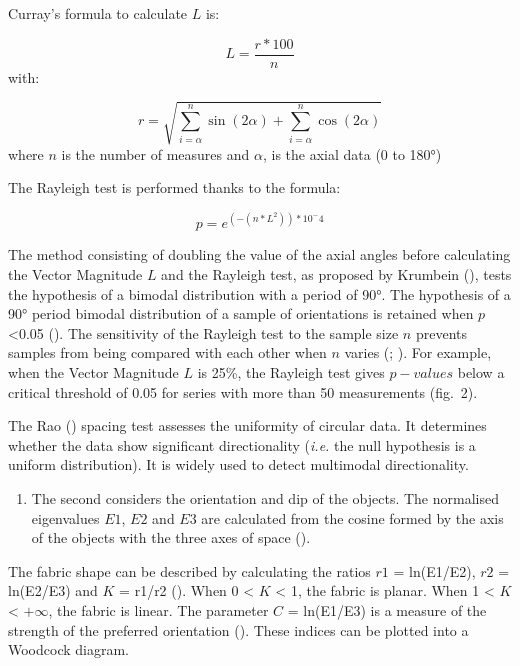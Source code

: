 \documentclass[
]{article}
\providecommand{\tightlist}{%
  \setlength{\itemsep}{0pt}\setlength{\parskip}{0pt}}
\begin{document}
Curray's formula to calculate \(L\) is:

\[L = \frac{r*100}{n}\] with:

\[r = \sqrt{\sum_{i=\alpha}^n \sin{(2\alpha)} + \sum_{i=\alpha}^n \cos{(2\alpha)}}\]
\smallbreak where \(n\) is the number of measures and \(\alpha\), is the
axial data (0 to 180°) \smallbreak

The Rayleigh test is performed thanks to the formula:

\[p = e^{(-(n*L^2))*10^-4}\]

The method consisting of doubling the value of the axial angles before
calculating the Vector Magnitude \(L\) and the Rayleigh test, as
proposed by Krumbein (), tests the
hypothesis of a bimodal distribution with a period of 90°. The
hypothesis of a 90° period bimodal distribution of a sample of
orientations is retained when \(p\) \textless0.05
(). The sensitivity of the
Rayleigh test to the sample size \(n\) prevents samples from being
compared with each other when \(n\) varies
(;
). For example, when
the Vector Magnitude \(L\) is 25\%, the Rayleigh test gives \(p-values\)
below a critical threshold of 0.05 for series with more than 50
measurements (fig.~2).

The Rao () spacing test assesses the
uniformity of circular data. It determines whether the data show
significant directionality (\emph{i.e.} the null hypothesis is a uniform
distribution). It is widely used to detect multimodal directionality.

\begin{enumerate}
\def\labelenumi{\arabic{enumi}.}
\setcounter{enumi}{1}
\tightlist
\item
  The second considers the orientation and dip of the objects. The
  normalised eigenvalues \(E1\), \(E2\) and \(E3\) are calculated from
  the cosine formed by the axis of the objects with the three axes of
  space ().
\end{enumerate}

The fabric shape can be described by calculating the ratios \(r1\) =
ln(E1/E2), \(r2\) = ln(E2/E3) and \(K\) = r1/r2
(). When 0 \textless{} \(K\)
\textless{} 1, the fabric is planar. When 1 \textless{} \(K\)
\textless{} \(+\infty\), the fabric is linear. The parameter \(C\) =
ln(E1/E3) is a measure of the strength of the preferred orientation
(). These indices can be
plotted into a Woodcock diagram.
\end{document}
